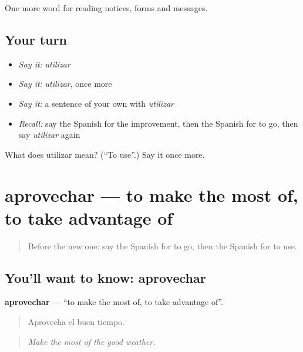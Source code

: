 \begin{grammarlens}[title={What you've built}]
One more word for reading notices, forms and messages.
\end{grammarlens}

\subsection*{Your turn}
\begin{itemize}
\raggedright
  \item \emph{Say it:} \emph{utilizar}
  \item \emph{Say it:} \emph{utilizar}, once more
  \item \emph{Say it:} a sentence of your own with \emph{utilizar}
  \item \emph{Recall:} say the Spanish for the improvement, then the Spanish for to go, then say \emph{utilizar} again
\end{itemize}

\begin{tcolorbox}[breakable,colback=teal!4,colframe=teal!35!black,title={Before you move on}]
What does utilizar mean? (\textquotedblleft{}To use\textquotedblright{}.) Say it once more.
\end{tcolorbox}
\section[aprovechar]{aprovechar — to make the most of, to take advantage of}

\label{lesson:ES-C484-aprovechar}



\begin{quote}
Before the new one: say the Spanish for to go, then the Spanish for to use.
\end{quote}

\subsection*{You'll want to know: aprovechar}
\textbf{aprovechar} — \textquotedblleft{}to make the most of, to take advantage of\textquotedblright{}.

\begin{quote}
Aprovecha el buen tiempo.
\end{quote}

\begin{quote}
\emph{Make the most of the good weather.}
\end{quote}

